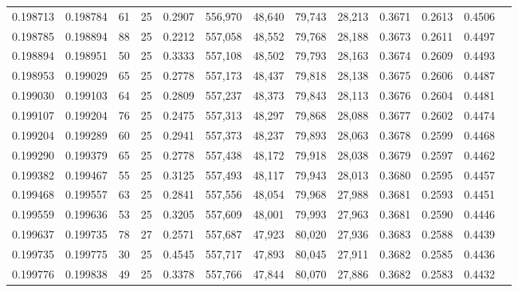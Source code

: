 \begin{tabular}{rrrrrrrrrrrrr}
0.198713 & 0.198784 &    61 &  25 &                                     0.2907 & 556,970 &  48,640 &  79,743 &  28,213 & 0.3671 & 0.2613 & 0.4506 \\
0.198785 & 0.198894 &    88 &  25 &                                     0.2212 & 557,058 &  48,552 &  79,768 &  28,188 & 0.3673 & 0.2611 & 0.4497 \\
0.198894 & 0.198951 &    50 &  25 &                                     0.3333 & 557,108 &  48,502 &  79,793 &  28,163 & 0.3674 & 0.2609 & 0.4493 \\
0.198953 & 0.199029 &    65 &  25 &                                     0.2778 & 557,173 &  48,437 &  79,818 &  28,138 & 0.3675 & 0.2606 & 0.4487 \\
0.199030 & 0.199103 &    64 &  25 &                                     0.2809 & 557,237 &  48,373 &  79,843 &  28,113 & 0.3676 & 0.2604 & 0.4481 \\
0.199107 & 0.199204 &    76 &  25 &                                     0.2475 & 557,313 &  48,297 &  79,868 &  28,088 & 0.3677 & 0.2602 & 0.4474 \\
0.199204 & 0.199289 &    60 &  25 &                                     0.2941 & 557,373 &  48,237 &  79,893 &  28,063 & 0.3678 & 0.2599 & 0.4468 \\
0.199290 & 0.199379 &    65 &  25 &                                     0.2778 & 557,438 &  48,172 &  79,918 &  28,038 & 0.3679 & 0.2597 & 0.4462 \\
0.199382 & 0.199467 &    55 &  25 &                                     0.3125 & 557,493 &  48,117 &  79,943 &  28,013 & 0.3680 & 0.2595 & 0.4457 \\
0.199468 & 0.199557 &    63 &  25 &                                     0.2841 & 557,556 &  48,054 &  79,968 &  27,988 & 0.3681 & 0.2593 & 0.4451 \\
0.199559 & 0.199636 &    53 &  25 &                                     0.3205 & 557,609 &  48,001 &  79,993 &  27,963 & 0.3681 & 0.2590 & 0.4446 \\
0.199637 & 0.199735 &    78 &  27 &                                     0.2571 & 557,687 &  47,923 &  80,020 &  27,936 & 0.3683 & 0.2588 & 0.4439 \\
0.199735 & 0.199775 &    30 &  25 &                                     0.4545 & 557,717 &  47,893 &  80,045 &  27,911 & 0.3682 & 0.2585 & 0.4436 \\
0.199776 & 0.199838 &    49 &  25 &                                     0.3378 & 557,766 &  47,844 &  80,070 &  27,886 & 0.3682 & 0.2583 & 0.4432 \\

\end{tabular}
